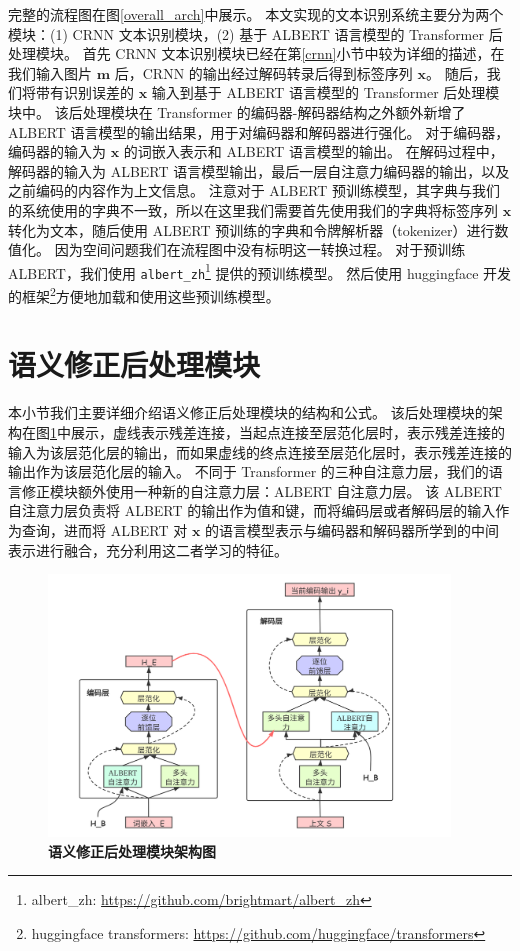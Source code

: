 完整的流程图在图\ref{overall_arch}中展示。
本文实现的文本识别系统主要分为两个模块：(1) CRNN 文本识别模块，(2) 基于 ALBERT 语言模型的 Transformer 后处理模块。
首先 CRNN 文本识别模块已经在第\ref{crnn}小节中较为详细的描述，在我们输入图片 $\bm{m}$ 后，CRNN 的输出经过解码转录后得到标签序列 $\bm{x}$。
随后，我们将带有识别误差的 $\bm{x}$ 输入到基于 ALBERT 语言模型的 Transformer 后处理模块中。
该后处理模块在 Transformer 的编码器-解码器结构之外额外新增了 ALBERT 语言模型的输出结果，用于对编码器和解码器进行强化。
对于编码器，编码器的输入为 $\bm{x}$ 的词嵌入表示和 ALBERT 语言模型的输出。
在解码过程中，解码器的输入为 ALBERT 语言模型输出，最后一层自注意力编码器的输出，以及之前编码的内容作为上文信息。
注意对于 ALBERT 预训练模型，其字典与我们的系统使用的字典不一致，所以在这里我们需要首先使用我们的字典将标签序列 $\bm{x}$ 转化为文本，随后使用 ALBERT 预训练的字典和令牌解析器（tokenizer）进行数值化。
因为空间问题我们在流程图中没有标明这一转换过程。
对于预训练 ALBERT，我们使用 \texttt{albert\_zh}\footnote{albert\_zh: \url{https://github.com/brightmart/albert_zh}} 提供的预训练模型。
然后使用 huggingface 开发的框架\footnote{huggingface transformers: \url{https://github.com/huggingface/transformers}}方便地加载和使用这些预训练模型。

\section{语义修正后处理模块}
\label{postprocess}

本小节我们主要详细介绍语义修正后处理模块的结构和公式。
该后处理模块的架构在图\ref{postprocess_arch}中展示，虚线表示残差连接\cite{ResNet}，当起点连接至层范化层时，表示残差连接的输入为该层范化层的输出，而如果虚线的终点连接至层范化层时，表示残差连接的输出作为该层范化层的输入。
不同于 Transformer 的三种自注意力层，我们的语言修正模块额外使用一种新的自注意力层：ALBERT 自注意力层。
该 ALBERT 自注意力层负责将 ALBERT 的输出作为值和键，而将编码层或者解码层的输入作为查询，进而将 ALBERT 对 $\bm{x}$ 的语言模型表示与编码器和解码器所学到的中间表示进行融合，充分利用这二者学习的特征。


\begin{figure}[h!]
	\centering
	\includegraphics[width=0.95\textwidth]{figure/resources/ALBERT_NMT.png}
	\caption{\textbf{语义修正后处理模块架构图}\label{postprocess_arch}}
\end{figure}


